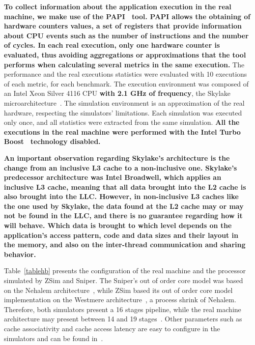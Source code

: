 \documentclass[AMA,final,STIX1COL]{WileyNJD-v2}
\newcommand\new[1]{{\color{red}\textbf{#1}}}
\newcommand{\ms}[1]{\textcolor{orange}{\bfseries \ul{ msserpa: #1} }\vspace{0.2cm}}
\begin{document}
\new{To collect information about the application execution in the real machine, we make use of the PAPI~\cite{terpstra2010papi} tool.
PAPI allows the obtaining of hardware counters values, a set of registers that provide information about CPU events such as the number of instructions and the number of cycles.
In each real execution, only one hardware counter is evaluated, thus avoiding aggregations or approximations that the tool performs when calculating several metrics in the same execution.}
The performance and the real executions statistics were evaluated with 10 executions of each metric, for each benchmark.
The execution environment was composed of an Intel Xeon Silver 4116 CPU \textbf{with 2.1 GHz of frequency}, the Skylake microarchitecture~\cite{doweck2017skylake}.
The simulation environment is an approximation of the real hardware, respecting the simulators' limitations.
Each simulation was executed only once, and all statistics were extracted from the same simulation.
\textbf{All the executions in the real machine were performed with the Intel Turbo Boost~\cite{rotem2012turbo} technology disabled.}

\textbf{An important observation regarding Skylake's architecture is the change from an inclusive L3 cache to a non-inclusive one.
Skylake's predecessor architecture was Intel Broadwell, which applies an inclusive L3 cache, meaning that all data brought into the L2 cache is also brought into the LLC.
However, in non-inclusive L3 caches like the one used by Skylake, the data found at the L2 cache may or may not be found in the LLC, and there is no guarantee regarding how it will behave.
Which data is brought to which level depends on the application's access pattern, code and data sizes and their layout in the memory, and also on the inter-thread communication and sharing behavior.
}


Table~\ref{tablehb}  presents the configuration of the real machine and the processor simulated by ZSim and Sniper. 
The Sniper's out of order core model was based on the Nehalem architecture~\cite{carlson2011sniper}, while ZSim based its out of order core model implementation on the Westmere architecture~\cite{sanchez2013zsim}, a process shrink of Nehalem.
Therefore, both simulators present a 16 stages pipeline, while the real machine architecture may present between 14 and 19 stages~\cite{fog2012microarchitecture}.
Other parameters such as cache associativity and cache access latency are easy to configure in the simulators and can be found in~\cite{fog2012microarchitecture,doweck2017skylake}.
\end{document}

